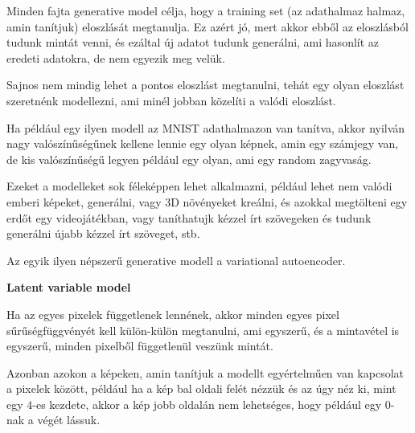 \documentclass[12pt]{amsart}
\begin{document}
\vspace{10pt}

Minden fajta generative model célja, hogy a training set (az
adathalmaz halmaz, amin tanítjuk) eloszlását megtanulja. Ez
azért jó, mert akkor ebből az eloszlásból tudunk mintát
venni, és ezáltal új adatot tudunk generálni, ami hasonlít
az eredeti adatokra, de nem egyezik meg velük.

\vspace{5pt}

Sajnos nem mindig lehet a pontos eloszlást megtanulni, tehát
egy olyan eloszlást szeretnénk modellezni, ami minél jobban
közelíti a valódi eloszlást. 

\vspace{5pt}

Ha például egy ilyen modell az MNIST adathalmazon van
tanítva, akkor nyilván nagy valószínűségűnek kellene lennie
egy olyan képnek, amin egy számjegy van, de kis valószínűségű
legyen például egy olyan, ami egy random zagyvaság.

\vspace{5pt}

Ezeket a modelleket sok féleképpen lehet alkalmazni, például
lehet nem valódi emberi képeket, generálni, vagy 3D
növényeket kreálni, és azokkal megtölteni egy erdőt egy
videojátékban, vagy taníthatujk kézzel írt szövegeken és
tudunk generálni újabb
kézzel írt szöveget, stb.

\vspace{5pt}

Az egyik ilyen népszerű generative modell a variational
autoencoder.

\vspace{10pt}

\noindent
\textbf{Latent variable model}

\vspace{10pt}

Ha az egyes pixelek függetlenek lennének, akkor minden egyes
pixel sűrűségfüggvényét kell külön-külön megtanulni, ami
egyszerű, és a mintavétel is egyszerű, minden pixelből
függetlenül veszünk mintát.

\vspace{5pt}

Azonban azokon a képeken, amin tanítjuk a modellt
egyértelműen van kapcsolat a pixelek között, például ha a
kép bal oldali felét nézzük és az úgy néz ki, mint egy $4$-es
kezdete, akkor a kép jobb oldalán nem lehetséges, hogy
például egy $0$-nak a végét lássuk.

\vspace{5pt}
\end{document}
